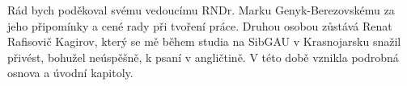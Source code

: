 \documentclass[11pt,twoside,a4paper]{book}
\newcommand\TypeOfWork{Diplomová práce} %
\newcommand\StudProgram{Elektrotechnika a informatika, strukturovaný, Navazující magisterský}
\newcommand\StudBranch{Výpočetní technika}   %
\newcommand\WorkTitle{Interpret grafových algoritmů}
\newcommand\FirstandFamilyName{Bc. Michal Turek}
\newcommand\Supervisor{RNDr. Marko Genyk-Berezovskyj}
\begin{document}




\coverpagestarts



\acknowledgements
\noindent

\noindent Rád bych poděkoval svému vedoucímu RNDr. Marku Genyk-Berezovskému za jeho připomínky a cené rady při tvoření práce. Druhou osobou zůstává Renat Rafisovič Kagirov, který se mě během studia na SibGAU v Krasnojarsku snažil přivést, bohužel neúspěšně, k psaní v angličtině. V této době vznikla podrobná osnova a úvodní kapitoly.





\end{document}

